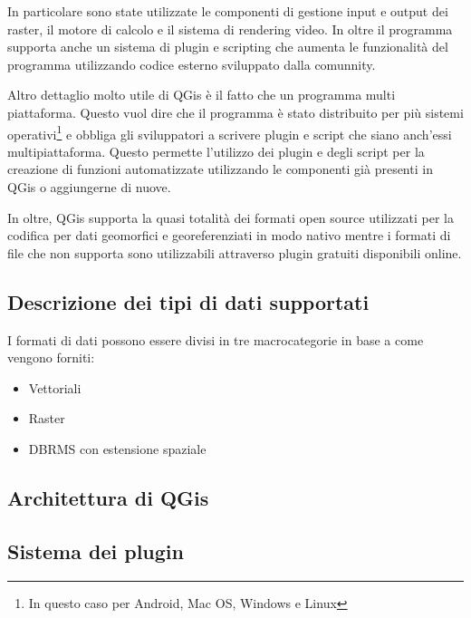 In particolare sono state utilizzate le componenti di gestione input e output dei raster, il motore di calcolo e il sistema di rendering video. In oltre il programma supporta anche un sistema di plugin e scripting che aumenta le funzionalità del programma utilizzando codice esterno sviluppato dalla comunnity. 

Altro dettaglio molto utile di QGis è il fatto che un programma multi piattaforma. Questo vuol dire che il programma è stato distribuito per più sistemi operativi\footnote{In questo caso per Android, Mac OS, Windows e Linux} e obbliga gli sviluppatori a scrivere plugin e script che siano anch'essi multipiattaforma. Questo permette l'utilizzo dei plugin e degli script per la creazione di funzioni automatizzate utilizzando le componenti già presenti in QGis o aggiungerne di nuove.

In oltre, QGis supporta la quasi totalità dei formati open source utilizzati per la codifica per dati geomorfici e georeferenziati in modo nativo mentre i formati di file che non supporta sono utilizzabili attraverso plugin gratuiti disponibili online.

\subsection{Descrizione dei tipi di dati supportati}

I formati di dati possono essere divisi in tre macrocategorie in base a come vengono forniti:
\begin{itemize}
	\item Vettoriali
	\item Raster
	\item DBRMS con estensione spaziale
\end{itemize}


\subsection{Architettura di QGis}

\subsection{Sistema dei plugin}
